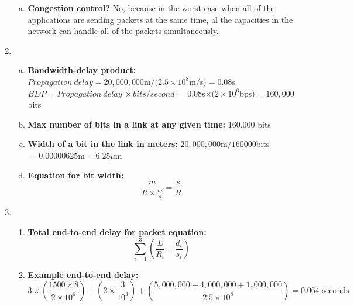 \documentclass[11pt]{article}
\begin{document}
\begin{enumerate}[1]
\begin{enumerate}[(a)]
    \item \textbf{Congestion control?} 
    No, because in the worst case when all of the applications are sending packets at the same time, al the capacities in the network can handle all of the packets simultaneously.
  \end{enumerate}

\item %
  
  \begin{enumerate}[(a)]

    \item \textbf{Bandwidth-delay product:} \\
      $Propagation\ delay = 20,000,000$m$ / (2.5 \times 10^8$m$/$s$) = 0.08$s \\
      $BDP = Propagation\ delay\ \times bits/second = \ 0.08$s$ \times (2 \times 10^6$bps$) = 160,000$ bits
    \item \textbf{Max number of bits in a link at any given time:}
      160,000 bits
    \item \textbf{Width of a bit in the link in meters:}
      $20,000,000$m$/160000$bits$ = 0.00000625$m$ = 6.25\mu$m
    \item \textbf{Equation for bit width:} 
    \begin{equation}
      \frac{m}{R \times \frac{m}{s}} = \frac{s}{R}
    \end{equation}

  \end{enumerate}

\item %
  \begin{enumerate}[]
    \item \textbf{Total end-to-end delay for packet equation:}
      \begin{equation}
        \sum_{i=1}^{3} \left(\frac{L}{R_i} + \frac{d_i}{s_i}\right)
      \end{equation}
    \item \textbf{Example end-to-end delay:}
    \begin{equation}
      3\times\left(\frac{1500\times8}{2\times10^6}\right) + \left(2\times\frac{3}{10^3}\right) + \left(\frac{5,000,000 + 4,000,000 + 1,000,000}{2.5\times10^8}\right) =
     0.064 \text{ seconds}
    \end{equation}
  \end{enumerate}


\end{enumerate}
\end{document}
